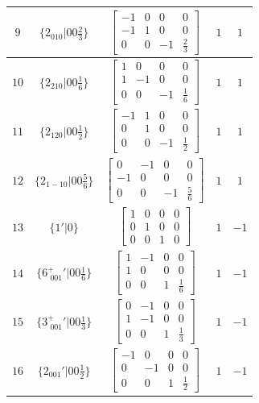 \documentclass[fleqn,8pt]{jsarticle}
\begin{document}
\begin{longtable}{ccccc}
$ 9 $ & $ \{2{}_{010}|0 0 \frac{2}{3}\} $ & $ \begin{bmatrix} -1 & 0 & 0 & 0 \\ -1 & 1 & 0 & 0 \\ 0 & 0 & -1 & \frac{2}{3} \end{bmatrix} $ & $ 1 $ & $ 1 $ \\ \hline
$ 10 $ & $ \{2{}_{210}|0 0 \frac{1}{6}\} $ & $ \begin{bmatrix} 1 & 0 & 0 & 0 \\ 1 & -1 & 0 & 0 \\ 0 & 0 & -1 & \frac{1}{6} \end{bmatrix} $ & $ 1 $ & $ 1 $ \\ \hline
$ 11 $ & $ \{2{}_{120}|0 0 \frac{1}{2}\} $ & $ \begin{bmatrix} -1 & 1 & 0 & 0 \\ 0 & 1 & 0 & 0 \\ 0 & 0 & -1 & \frac{1}{2} \end{bmatrix} $ & $ 1 $ & $ 1 $ \\ \hline
$ 12 $ & $ \{2{}_{1-10}|0 0 \frac{5}{6}\} $ & $ \begin{bmatrix} 0 & -1 & 0 & 0 \\ -1 & 0 & 0 & 0 \\ 0 & 0 & -1 & \frac{5}{6} \end{bmatrix} $ & $ 1 $ & $ 1 $ \\ \hline
$ 13 $ & $ \{1{}'|0\} $ & $ \begin{bmatrix} 1 & 0 & 0 & 0 \\ 0 & 1 & 0 & 0 \\ 0 & 0 & 1 & 0 \end{bmatrix} $ & $ 1 $ & $ -1 $ \\ \hline
$ 14 $ & $ \{6^{+}_{\,\,001}{}'|0 0 \frac{1}{6}\} $ & $ \begin{bmatrix} 1 & -1 & 0 & 0 \\ 1 & 0 & 0 & 0 \\ 0 & 0 & 1 & \frac{1}{6} \end{bmatrix} $ & $ 1 $ & $ -1 $ \\ \hline
$ 15 $ & $ \{3^{+}_{\,\,001}{}'|0 0 \frac{1}{3}\} $ & $ \begin{bmatrix} 0 & -1 & 0 & 0 \\ 1 & -1 & 0 & 0 \\ 0 & 0 & 1 & \frac{1}{3} \end{bmatrix} $ & $ 1 $ & $ -1 $ \\ \hline
$ 16 $ & $ \{2{}_{001}{}'|0 0 \frac{1}{2}\} $ & $ \begin{bmatrix} -1 & 0 & 0 & 0 \\ 0 & -1 & 0 & 0 \\ 0 & 0 & 1 & \frac{1}{2} \end{bmatrix} $ & $ 1 $ & $ -1 $ \\ \hline

\end{longtable}
\end{document}
